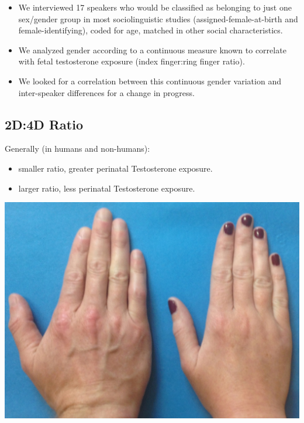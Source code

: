 \documentclass[a0,portrait]{a0poster}
\begin{document}
\begin{multicols}{2}
\begin{itemize}
	\item We interviewed 17 speakers who would be classified as belonging to just one sex/gender group in most sociolinguistic studies (assigned-female-at-birth and female-identifying), coded for age, matched in other social characteristics.
	\item We analyzed gender according to a continuous measure known to correlate with fetal testosterone exposure (index finger:ring finger ratio).
	\item We looked for a correlation between this continuous gender variation and inter-speaker differences for a change in progress.
\end{itemize}

\subsection*{2D:4D Ratio}
Generally (in humans and non-humans):

\begin{itemize}
	\item smaller ratio, greater perinatal Testosterone exposure.
	\item larger ratio, less perinatal Testosterone exposure.
\end{itemize}
\begin{center}\vspace{1cm}
\includegraphics[width=0.8\linewidth]{realhands.png}
\end{center}\vspace{1cm}



\end{multicols}
\end{document}
